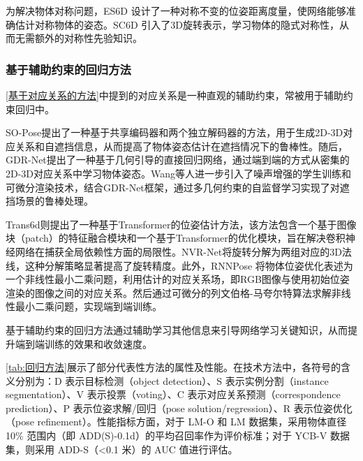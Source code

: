 \par 为解决物体对称问题，ES6D\cite{mo2022es6d} 设计了一种对称不变的位姿距离度量，使网络能够准确估计对称物体的姿态。SC6D\cite{cai2022sc6d} 引入了3D旋转表示，学习物体的隐式对称性，从而无需额外的对称性先验知识。

\subsubsection{基于辅助约束的回归方法}\label{基于辅助约束的回归方法}

\par \autoref{基于对应关系的方法}中提到的对应关系是一种直观的辅助约束，常被用于辅助约束回归中。

\par SO-Pose\cite{Di_2021_ICCV}提出了一种基于共享编码器和两个独立解码器的方法，用于生成2D-3D对应关系和自遮挡信息，从而提高了物体姿态估计在遮挡情况下的鲁棒性。随后，GDR-Net\cite{wang2021gdr}提出了一种基于几何引导的直接回归网络，通过端到端的方式从密集的2D-3D对应关系中学习物体姿态。Wang等人\cite{wang2021occlusion}进一步引入了噪声增强的学生训练和可微分渲染技术，结合GDR-Net框架\cite{wang2021gdr}，通过多几何约束的自监督学习实现了对遮挡场景的鲁棒处理。

\par Trans6d\cite{zhang2022trans6d}则提出了一种基于Transformer的位姿估计方法，该方法包含一个基于图像块（patch）的特征融合模块和一个基于Transformer的优化模块，旨在解决卷积神经网络在捕获全局依赖性方面的局限性。NVR-Net\cite{feng2023nvr}将旋转分解为两组对应的3D法线，这种分解策略显著提高了旋转精度。此外，RNNPose\cite{Xu2024RNNPose} 将物体位姿优化表述为一个非线性最小二乘问题，利用估计的对应关系场，即RGB图像与使用初始位姿渲染的图像之间的对应关系。然后通过可微分的列文伯格-马夸尔特算法\cite{Levenberg_Marquardt}求解非线性最小二乘问题，实现端到端训练。

\par 基于辅助约束的回归方法通过辅助学习其他信息来引导网络学习关键知识，从而提升端到端训练的效果和收敛速度。

\autoref{tab:回归方法}展示了部分代表性方法的属性及性能。在技术方法中，各符号的含义分别为：D 表示目标检测（object detection）、S 表示实例分割（instance segmentation）、V 表示投票（voting）、C 表示对应关系预测（correspondence prediction）、P 表示位姿求解/回归（pose solution/regression）、R 表示位姿优化（pose refinement）。性能指标方面，对于 LM-O 和 LM 数据集，采用物体直径 10\% 范围内（即 ADD(S)-0.1d）的平均召回率作为评价标准；对于 YCB-V 数据集，则采用 ADD-S（<0.1 米）的 AUC 值进行评估。


